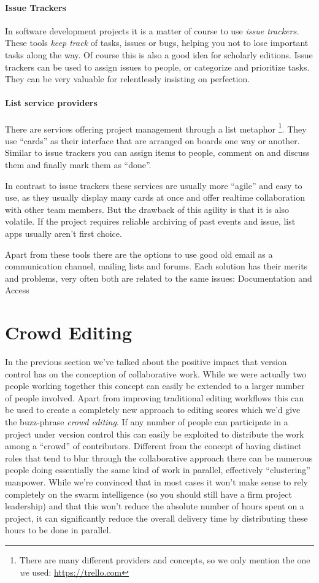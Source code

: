 \documentclass[11pt,a4paper]{article}
\begin{document}
\paragraph{Issue Trackers}
In software development projects it is a matter of course to use \emph{issue trackers.}
These tools \emph{keep track} of tasks, issues or bugs, helping you not to lose important
tasks along the way. Of course this is also a good idea for scholarly editions. Issue
trackers can be used to assign issues to people, or categorize and prioritize tasks.
They can be very valuable for relentlessly insisting on perfection.

\paragraph{List service providers}
There are services offering project management through a list metaphor%
\footnote{There are many different providers and concepts, so we only mention the one
\emph{we} used: \url{https://trello.com}}.
They use “cards” as their interface that are arranged on boards one way or another.
Similar to issue trackers you can assign items to people, comment on and discuss them and
finally mark them as “done”.

In contrast to issue trackers these services are usually more “agile” and easy to use, as
they usually display many cards at once and offer realtime collaboration with other
team members. But the drawback of this agility is that it is also volatile. If the project
requires reliable archiving of past events and issue, list apps usually aren't first choice.

\medskip
Apart from these tools there are the options to use good old email as a communication channel, mailing lists and forums. Each solution has their merits and problems, very often both are related to the same issues: Documentation and Access


\section{Crowd Editing}
In the previous section we've talked about the positive impact that version control
has on the conception of collaborative work. While we were actually two people
working together this concept can easily be extended to a larger number of people
involved. Apart from improving traditional editing workflows this can be used to create a
completely new approach to editing scores which we'd give the buzz-phrase \emph{crowd
editing}. If any number of people can participate in a project under version control
this can easily be exploited to distribute the work among a “crowd” of contributors.
Different from the concept of having distinct roles that tend to blur through the
collaborative approach there can be numerous people doing essentially the same kind
of work in parallel, effectively “clustering” manpower. While we're convinced that
in most cases it won't make sense to rely completely on the swarm intelligence (so
you should still have a firm project leadership) and that this won't reduce the
absolute number of hours spent on a project, it can significantly reduce the overall
delivery time by distributing these hours to be done in parallel.
\end{document}
